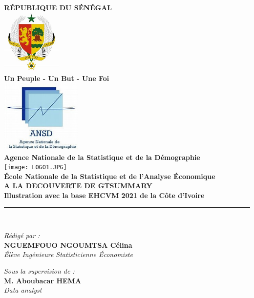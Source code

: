 \documentclass[
]{article}
\author{}
\date{\vspace{-2.5em}}
\begin{document}
\begin{titlepage}
    \begin{center}
        \textbf{\LARGE RÉPUBLIQUE DU SÉNÉGAL}\\[0.1cm]
        \includegraphics[width=3cm]{LOGO3.JPG} \\[0.1cm]  %
        \textbf{\large Un Peuple - Un But - Une Foi}\\[0.2cm]
        
        \includegraphics[width=4cm]{LOGO2.JPG} \\[0.1cm] 
        
        \textbf{\large Agence Nationale de la Statistique et de la Démographie}\\[0.2cm]
        
        \texttt{[image: LOGO1.JPG]} \\[0.1cm]  
        
        \textbf{\large École Nationale de la Statistique et de l'Analyse Économique}\\[0.4cm]
        
        \textbf{\LARGE A LA DECOUVERTE DE GTSUMMARY}\\[0.3cm]
        \textbf{\Huge \color{orange} \textsf{Illustration avec la base EHCVM 2021 de la Côte d'Ivoire}}\\[0.2cm]
        \rule{\linewidth}{0.2mm} \\[0.5cm]
        
        \begin{minipage}{0.5\textwidth}
    \begin{flushleft} \large
        \emph{\textsf{Rédigé par :}}\\
        \textbf{NGUEMFOUO NGOUMTSA Célina}\\
        \textit{Élève Ingénieure Statisticienne Économiste}
    \end{flushleft}
\end{minipage}
        \hfill
        \begin{minipage}{0.4\textwidth}
            \begin{flushright} \large
                \emph{\textsf{Sous la supervision de :}} \\
                \textbf{M. Aboubacar HEMA}\\
                \textit{Data analyst}
            \end{flushright}
        \end{minipage}


\end{center}
\end{titlepage}
\end{document}
